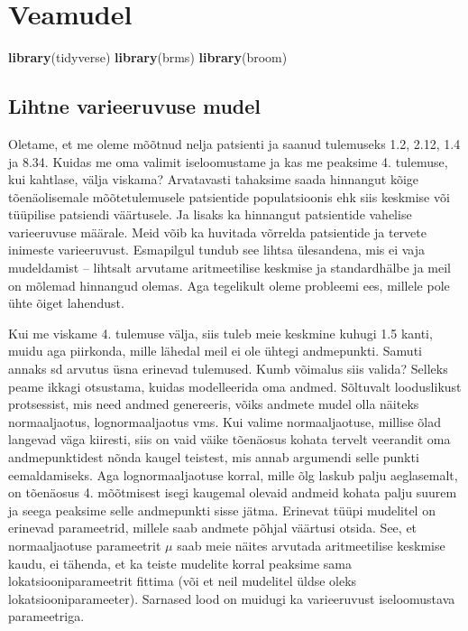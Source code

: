 \documentclass[]{book}
\newenvironment{Shaded}{\begin{snugshade}}{\end{snugshade}}
\newcommand{\KeywordTok}[1]{\textcolor[rgb]{0.13,0.29,0.53}{\textbf{#1}}}
\newcommand{\NormalTok}[1]{#1}
\begin{document}
\chapter{Veamudel}\label{veamudel}

\begin{Shaded}
\begin{Highlighting}[]
\KeywordTok{library}\NormalTok{(tidyverse)}
\KeywordTok{library}\NormalTok{(brms)}
\KeywordTok{library}\NormalTok{(broom)}
\end{Highlighting}
\end{Shaded}

\section{Lihtne varieeruvuse mudel}\label{lihtne-varieeruvuse-mudel}

Oletame, et me oleme mõõtnud nelja patsienti ja saanud tulemuseks 1.2,
2.12, 1.4 ja 8.34. Kuidas me oma valimit iseloomustame ja kas me
peaksime 4. tulemuse, kui kahtlase, välja viskama? Arvatavasti tahaksime
saada hinnangut kõige tõenäolisemale mõõtetulemusele patsientide
populatsioonis ehk siis keskmise või tüüpilise patsiendi väärtusele. Ja
lisaks ka hinnangut patsientide vahelise varieeruvuse määrale. Meid võib
ka huvitada võrrelda patsientide ja tervete inimeste varieeruvust.
Esmapilgul tundub see lihtsa ülesandena, mis ei vaja mudeldamist --
lihtsalt arvutame aritmeetilise keskmise ja standardhälbe ja meil on
mõlemad hinnangud olemas. Aga tegelikult oleme probleemi ees, millele
pole ühte õiget lahendust.

Kui me viskame 4. tulemuse välja, siis tuleb meie keskmine kuhugi 1.5
kanti, muidu aga piirkonda, mille lähedal meil ei ole ühtegi
andmepunkti. Samuti annaks sd arvutus üsna erinevad tulemused. Kumb
võimalus siis valida? Selleks peame ikkagi otsustama, kuidas
modelleerida oma andmed. Sõltuvalt looduslikust protsessist, mis need
andmed genereeris, võiks andmete mudel olla näiteks normaaljaotus,
lognormaaljaotus vms. Kui valime normaaljaotuse, millise õlad langevad
väga kiiresti, siis on vaid väike tõenäosus kohata tervelt veerandit oma
andmepunktidest nõnda kaugel teistest, mis annab argumendi selle punkti
eemaldamiseks. Aga lognormaaljaotuse korral, mille õlg laskub palju
aeglasemalt, on tõenäosus 4. mõõtmisest isegi kaugemal olevaid andmeid
kohata palju suurem ja seega peaksime selle andmepunkti sisse jätma.
Erinevat tüüpi mudelitel on erinevad parameetrid, millele saab andmete
põhjal väärtusi otsida. See, et normaaljaotuse parameetrit \(\mu\) saab
meie näites arvutada aritmeetilise keskmise kaudu, ei tähenda, et ka
teiste mudelite korral peaksime sama lokatsiooniparameetrit fittima (või
et neil mudelitel üldse oleks lokatsiooniparameeter). Sarnased lood on
muidugi ka varieeruvust iseloomustava parameetriga.
\end{document}
